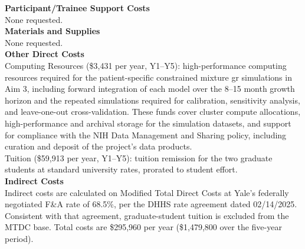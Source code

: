 \documentclass[11pt]{article}
\begin{document}
\textbf{Participant/Trainee Support Costs}\\[0em]
None requested.\\[.5em]
\textbf{Materials and Supplies}\\[0em]
None requested.\\[.5em]
\textbf{Other Direct Costs}\\[0em]
Computing Resources (\$3,431 per year, Y1--Y5): high-performance computing resources required for the patient-specific constrained mixture \gls*{gr} simulations in Aim 3, including forward integration of each model over the 8--15 month growth horizon and the repeated simulations required for calibration, sensitivity analysis, and leave-one-out cross-validation. These funds cover cluster compute allocations, high-performance and archival storage for the simulation datasets, and support for compliance with the NIH Data Management and Sharing policy, including curation and deposit of the project's data products.\\[.3em]
Tuition (\$59,913 per year, Y1--Y5): tuition remission for the two graduate students at standard university rates, prorated to student effort.\\[.5em]
\textbf{Indirect Costs}\\[0em]
Indirect costs are calculated on Modified Total Direct Costs at Yale's federally negotiated F\&A rate of 68.5\%, per the DHHS rate agreement dated 02/14/2025. Consistent with that agreement, graduate-student tuition is excluded from the MTDC base. Total costs are \$295,960 per year (\$1,479,800 over the five-year period).
\end{document}
